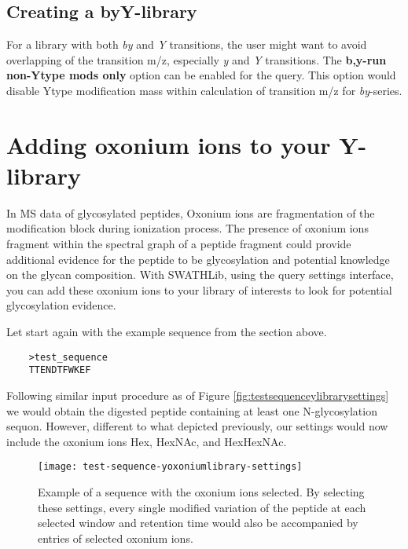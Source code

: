 \documentclass[../manual.tex]{subfiles}
\begin{document}
\subsection{Creating a byY-library}
For a library with both \emph{by} and \emph{Y} transitions, the user might want to avoid overlapping of the transition m/z, especially \emph{y} and \emph{Y} transitions. The \textbf{b,y-run non-Ytype mods only} option can be enabled for the query. This option would disable Ytype modification mass within calculation of transition m/z for \emph{by}-series.

\section{Adding oxonium ions to your Y-library}
In MS data of glycosylated peptides, Oxonium ions are fragmentation of the modification block during ionization process. The presence of oxonium ions fragment within the spectral graph of a peptide fragment could provide additional evidence for the peptide to be glycosylation and potential knowledge on the glycan composition. With SWATHLib, using the query settings interface, you can add these oxonium ions to your library of interests to look for potential glycosylation evidence.\par

Let start again with the example sequence from the section above.\par
\begin{verbatim}
	>test_sequence
	TTENDTFWKEF
\end{verbatim}

Following similar input procedure as of Figure \ref{fig:testsequenceylibrarysettings} we would obtain the digested peptide containing at least one N-glycosylation sequon. However, different to what depicted previously, our settings would now include the oxonium ions Hex, HexNAc, and HexHexNAc.\par

\begin{figure}[H]
	\centering
	\begin{framed}
        \centering
        \begin{adjustbox}{width=1\textwidth}
			\texttt{[image: test-sequence-yoxoniumlibrary-settings]}
		\end{adjustbox}
		\caption{Example of a sequence with the oxonium ions selected. By selecting these settings, every single modified variation of the peptide at each selected window and retention time would also be accompanied by entries of selected oxonium ions.}\label{fig:testsequenceyoxoniumlibrarysettings}
	\end{framed}
\end{figure}
\end{document}

